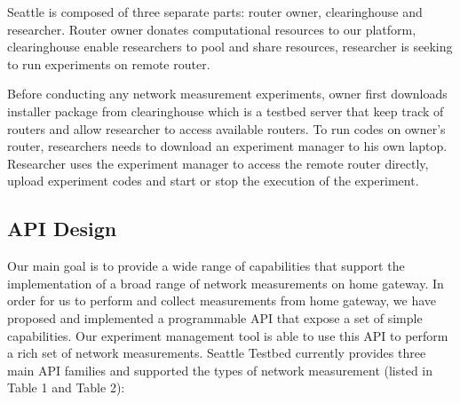 Seattle is composed of three separate parts: router owner, clearinghouse and 
researcher. Router owner donates computational resources to our platform, 
clearinghouse enable researchers to pool and share resources, researcher is 
seeking to run experiments on remote router.

Before conducting any network measurement experiments, owner first downloads 
installer package from clearinghouse which is a testbed server that keep 
track of routers and allow researcher to access available routers. To run 
codes on owner's router, researchers needs to download an experiment manager 
to his own laptop. Researcher uses the experiment manager to access the 
remote router directly, upload experiment codes and start or stop the 
execution of the experiment.

\subsection{API Design}
Our main goal is to provide a wide range of capabilities that support the 
implementation of a broad range of network measurements on home gateway. In 
order for us to perform and collect measurements from home gateway, we have 
proposed and implemented a programmable API that expose a set of simple 
capabilities. Our experiment management tool is able to use this API to 
perform a rich set of network measurements. Seattle Testbed currently 
provides three main API families and supported the types of network 
measurement (listed in Table 1 and Table 2):

